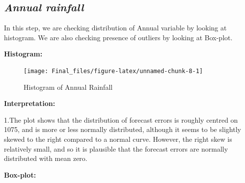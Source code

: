 \documentclass[12pt,openany]{book}
\newenvironment{Shaded}{\begin{snugshade}}{\end{snugshade}}
\newcommand{\CommentTok}[1]{\textcolor[rgb]{0.56,0.35,0.01}{\textit{#1}}}
\newcommand{\DataTypeTok}[1]{\textcolor[rgb]{0.13,0.29,0.53}{#1}}
\newcommand{\KeywordTok}[1]{\textcolor[rgb]{0.13,0.29,0.53}{\textbf{#1}}}
\newcommand{\NormalTok}[1]{#1}
\newcommand{\OperatorTok}[1]{\textcolor[rgb]{0.81,0.36,0.00}{\textbf{#1}}}
\newcommand{\OtherTok}[1]{\textcolor[rgb]{0.56,0.35,0.01}{#1}}
\newcommand{\StringTok}[1]{\textcolor[rgb]{0.31,0.60,0.02}{#1}}
\begin{document}
\hypertarget{annual-rainfall}{%
\subsection{\texorpdfstring{\textbf{\emph{Annual rainfall}}}{Annual rainfall}}\label{annual-rainfall}}

In this step, we are checking distribution of Annual variable by looking at histogram. We are also checking presence of outliers by looking at Box-plot.

\textbf{Histogram:}

\begin{Shaded}
\end{Shaded}

\begin{figure}

{\centering \texttt{[image: Final\_files/figure-latex/unnamed-chunk-8-1]} 

}

\caption{Histogram of Annual Rainfall}\label{fig:unnamed-chunk-8}
\end{figure}

\textbf{Interpretation:}

1.The plot shows that the distribution of forecast errors is roughly centred on 1075, and is more or less normally distributed, although it seems to be slightly skewed to the right compared to a normal curve. However, the right skew is relatively small, and so it is plausible that the forecast errors are normally distributed with mean zero.

\textbf{Box-plot:}

\begin{Shaded}
\end{Shaded}
\end{document}
